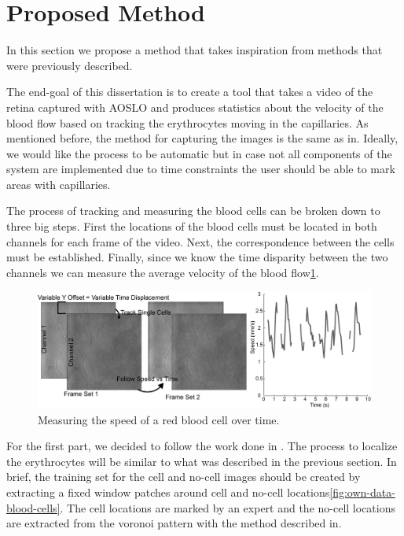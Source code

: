 \documentclass[]{article}
\begin{document}
\section{Proposed Method} 
In this section we propose a method that takes inspiration from methods that were previously described.

The end-goal of this dissertation is to create a tool that takes a video of the retina
captured with AOSLO and produces statistics about the velocity of the blood flow 
based on tracking the erythrocytes moving in the capillaries.
As mentioned before, the method for capturing the images is the same as in\cite{castro_rapid_2016}.
Ideally, we would like the process to be automatic but in case not all components
of the system are implemented due to time constraints the user should be able
to mark areas with capillaries.

The process of tracking and measuring the blood cells can be broken down to three 
big steps.
First the locations of the blood cells must be located in both channels for each frame of the video.
Next, the correspondence between the cells must be established.
Finally, since we know the time disparity between the two channels we can measure the average velocity of the blood flow\ref{fig:speed-of-cell-over-time}.

\begin{figure}[ht]
	\centering
	\includegraphics[width=\textwidth]{spatial_offset.png}
	\caption{Measuring the speed of a red blood cell over time.}
	\label{fig:speed-of-cell-over-time}
\end{figure}

For the first part, we decided to follow the work done in \cite{cunefare_open_2017}.
The process to localize the erythrocytes will be similar to what was described 
in the previous section.
In brief, the training set for the cell and no-cell images should be created by 
extracting a fixed window patches around cell and no-cell locations\ref{fig:own-data-blood-cells}.
The cell locations are marked by an expert and the no-cell
locations are extracted from the voronoi pattern with the method described
in\cite{cunefare_open_2017}.
\end{document}

